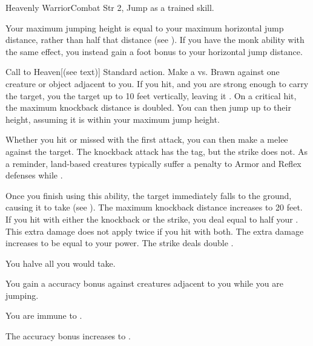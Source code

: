   \begin{feat}{Heavenly Warrior}{Combat}
    \featpre Str 2, Jump as a trained skill.

     Your maximum jumping height is equal to your maximum horizontal jump distance, rather than half that distance (see ).
    If you have the  monk ability with the same effect, you instead gain a  foot bonus to your horizontal jump distance.

    \begin{activeability}{Call to Heaven}[\atBrawling (see text)]
      \abilityusagetime Standard action.
      \rankline
      Make a  vs. Brawn against one creature or object adjacent to you.
      If you hit, and you are strong enough to carry the target, you  the target up to 10 feet vertically, leaving it .
      On a critical hit, the maximum knockback distance is doubled.
      You can then jump up to their height, assuming it is within your maximum jump height.

      Whether you hit or missed with the first attack, you can then make a melee  against the target.
      The knockback attack has the \atBrawling tag, but the strike does not.
      As a reminder, land-based creatures typically suffer a  penalty to Armor and Reflex defenses while .

      Once you finish using this ability, the target immediately falls to the ground, causing it to take  (see ).
      \rankline
       The maximum knockback distance increases to 20 feet.
       If you hit with either the knockback or the strike, you deal  equal to half your .
      This extra damage does not apply twice if you hit with both.
       The extra damage increases to be equal to your power.
       The strike deals double .
    \end{activeability}

     You halve all  you would take.

     You gain a  accuracy bonus against  creatures adjacent to you while you are jumping.

     You are immune to .

     The accuracy bonus increases to .
  \end{feat}

